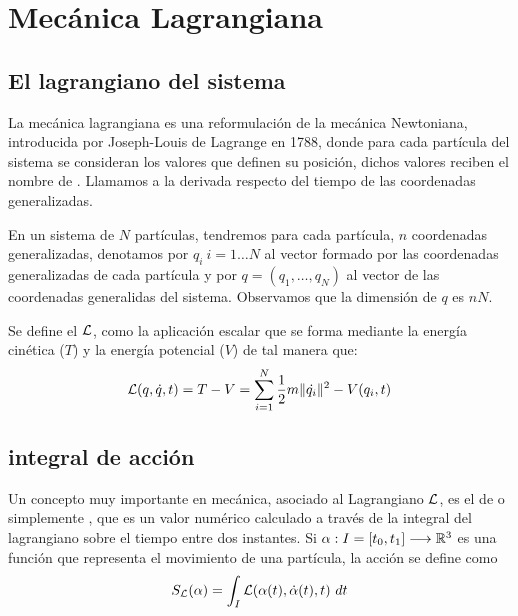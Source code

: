 \chapter{Mecánica Lagrangiana}\label{ch:mecanica-lagrangiana}

\section{El lagrangiano del sistema}\label{sec:el-lagrangiano-del-sistema}

La mecánica lagrangiana es una reformulación de la mecánica Newtoniana, introducida por Joseph-Louis de Lagrange en 1788, donde para cada partícula del sistema se consideran los valores que definen su posición, dichos valores reciben el nombre de .
Llamamos  a la derivada respecto del tiempo de las coordenadas generalizadas.

En un sistema de $N$ partículas, tendremos para cada partícula, $n$ coordenadas generalizadas, denotamos por $q_i\ i=1\dots N$ al vector formado por las coordenadas generalizadas de cada partícula y por $q=(q_1,\dots,q_N)$ al vector de las coordenadas generalidas del sistema.
Observamos que la dimensión de $q$ es $nN$.

Se define el  $\mathcal{L}$, como la aplicación escalar que se forma mediante la energía cinética ($T$) y la energía potencial ($V$) de tal manera que:
\begin{equation}
	\label{eq:lagrangiano_clasico}
	\mathcal{L}(q,\dot{q},t)=T-V=\sum\limits_{i=1}^{N} \frac{1}{2}m\|\dot{q_i}\|^2-V(q_i,t)
\end{equation}

\section{integral de acción}\label{sec:integral-de-accion}

Un concepto muy importante en mecánica, asociado al Lagrangiano $\mathcal{L}$, es el de  o simplemente , que es un valor numérico calculado a través de la integral del lagrangiano sobre el tiempo entre dos instantes.
Si $\alpha:I=[t_0, t_1]\longrightarrow \mathbb{R}^3$ es una función que representa el movimiento de una partícula, la acción se define como
\begin{equation}
	\label{eq:accion}
	S_{\mathcal{L}}(\alpha) = \int_{I}\mathcal{L}(\alpha(t), \dot{\alpha}(t), t)\ dt
\end{equation}

